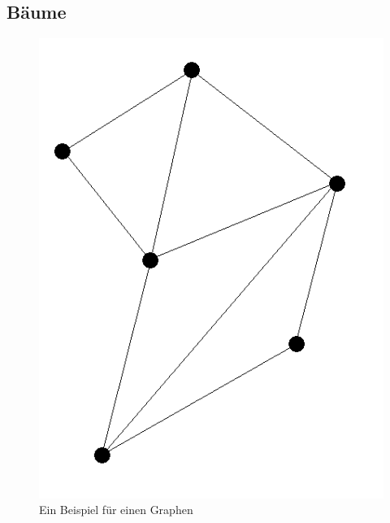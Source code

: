 \subsection{Bäume}\label{sec:baum}
\begin{figure}
	\centering
	\begin{minipage}{.5\textwidth}
		\centering
		\includegraphics[width=.9\linewidth]{../screenshots/graphexample.PNG}
		\caption{Ein Beispiel für einen Graphen}
		\label{abb:graph}
	\end{minipage}%
	\begin{minipage}{.5\textwidth}
		\centering

\end{minipage}
\end{figure}
